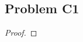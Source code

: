 \documentclass[../../../main.tex]{subfiles}
\begin{document}
\subsection{Problem C1}
\begin{wts}

\end{wts}
\begin{proof}

\end{proof}
\end{document}
